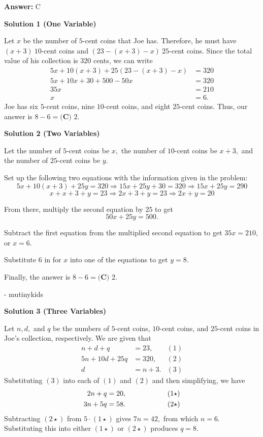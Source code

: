\begin{enumerate}
 \textbf{Answer: }C



\textbf{Solution 1 (One Variable)}

Let $x$ be the number of $5$-cent coins that Joe has. Therefore, he must have $(x+3) \ 10$-cent coins and $(23-(x+3)-x) \ 25$-cent coins. Since the total value of his collection is $320$ cents, we can write
 \begin{align*} 5x + 10(x+3) + 25(23-(x+3)-x) &= 320 \\ 5x + 10x + 30 + 500 - 50x &= 320 \\ 35x &= 210 \\ x &= 6. \end{align*}
 Joe has six $5$-cent coins, nine $10$-cent coins, and eight $25$-cent coins. Thus, our answer is $8-6 = \boxed{\textbf{(C) } 2}.$




\textbf{Solution 2 (Two Variables)}

Let the number of $5$-cent coins be $x,$ the number of $10$-cent coins be $x+3,$ and the number of $25$-cent coins be $y.$

 Set up the following two equations with the information given in the problem:
 \[5x+10(x+3)+25y=320 \Rightarrow 15x+25y+30=320 \Rightarrow 15x+25y=290\]
 \[x+x+3+y=23 \Rightarrow 2x+3+y=23 \Rightarrow 2x+y=20\]

 From there, multiply the second equation by $25$ to get 
 \[50x+25y=500.\]

 Subtract the first equation from the multiplied second equation to get $35x=210,$ or $x=6.$

 Substitute $6$ in for $x$ into one of the equations to get $y=8.$

 Finally, the answer is $8-6=\boxed{\textbf{(C) } 2}.$

 - mutinykids

 



\textbf{Solution 3 (Three Variables)}

Let $n,d,$ and $q$ be the numbers of $5$-cent coins, $10$-cent coins, and $25$-cent coins in Joe's collection, respectively. We are given that
 \begin{align*} n+d+q&=23, &(1) \\ 5n+10d+25q&=320, &(2) \\ d&=n+3. &(3) \end{align*}
Substituting $(3)$ into each of $(1)$ and $(2)$ and then simplifying, we have
 \begin{align*} 2n+q&=20, \hspace{17.5mm} &(1\star) \\ 3n+5q&=58. &(2\star) \end{align*}
Subtracting $(2\star)$ from $5\cdot(1\star)$ gives $7n=42,$ from which $n=6.$ Substituting this into either $(1\star)$ or $(2\star)$ produces $q=8.$


\end{enumerate}

